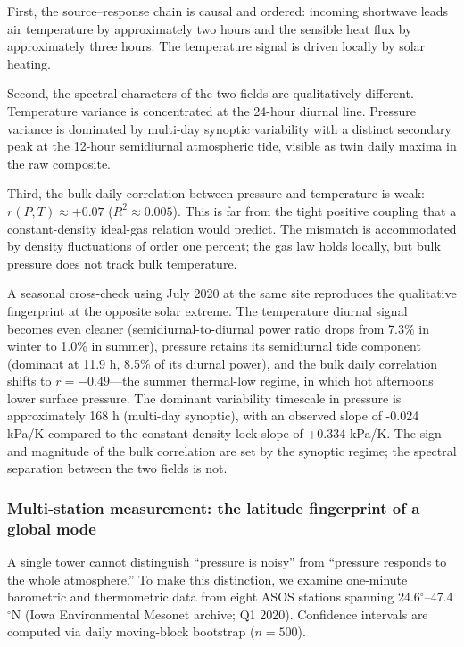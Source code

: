 \documentclass[11pt]{article}
\begin{document}
First, the source--response chain is causal and ordered: incoming shortwave leads air temperature by approximately two hours and the sensible heat flux by approximately three hours. The temperature signal is driven locally by solar heating.

Second, the spectral characters of the two fields are qualitatively different. Temperature variance is concentrated at the 24-hour diurnal line. Pressure variance is dominated by multi-day synoptic variability with a distinct secondary peak at the 12-hour semidiurnal atmospheric tide, visible as twin daily maxima in the raw composite.

Third, the bulk daily correlation between pressure and temperature is weak: $r(P,T)\approx +0.07$ ($R^{2}\approx 0.005$). This is far from the tight positive coupling that a constant-density ideal-gas relation would predict. The mismatch is accommodated by density fluctuations of order one percent; the gas law holds locally, but bulk pressure does not track bulk temperature.

A seasonal cross-check using July 2020 at the same site reproduces the qualitative fingerprint at the opposite solar extreme. The temperature diurnal signal becomes even cleaner (semidiurnal-to-diurnal power ratio drops from 7.3\% in winter to 1.0\% in summer), pressure retains its semidiurnal tide component (dominant at 11.9 h, 8.5\% of its diurnal power), and the bulk daily correlation shifts to $r=-0.49$---the summer thermal-low regime, in which hot afternoons lower surface pressure. The dominant variability timescale in pressure is approximately 168 h (multi-day synoptic), with an observed slope of -0.024 kPa/K compared to the constant-density lock slope of +0.334 kPa/K. The sign and magnitude of the bulk correlation are set by the synoptic regime; the spectral separation between the two fields is not.

\subsubsection{Multi-station measurement: the latitude fingerprint of a global mode}
\label{sec:asos}

A single tower cannot distinguish ``pressure is noisy'' from ``pressure responds to the whole atmosphere.'' To make this distinction, we examine one-minute barometric and thermometric data from eight ASOS stations spanning 24.6$^\circ$--47.4$^\circ$N (Iowa Environmental Mesonet archive; Q1 2020). Confidence intervals are computed via daily moving-block bootstrap ($n = 500$).
\end{document}
